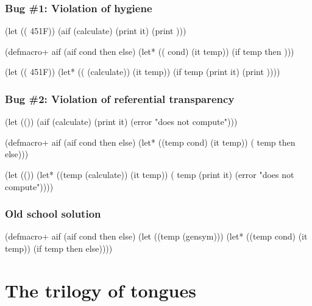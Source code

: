\documentclass[hyperref={bookmarks=false}]{beamer}
\begin{document}
\begin{frame}[fragile]
\frametitle{Bug \#1: Violation of hygiene}
\begin{semiverbatim}
(let ((\text{\color{blue}{temp}} 451{\textdegree}F))
  (aif (calculate)
    (print it)
    (print \text{\color{blue}{temp}})))

(defmacro+ aif
  (aif cond then else)
  (let* ((\text{\color{red}{temp}} cond)
         (it temp))
    (if temp then \text{\color{red}{else}})))

(let ((\text{\color{blue}{temp}} 451{\textdegree}F))
  (let* ((\text{\color{red}{temp}} (calculate))
         (it temp))
    (if temp
      (print it)
      (print \text{\color{red}{temp}}))))
\end{semiverbatim}
\end{frame}

\begin{frame}[fragile]
\frametitle{Bug \#2: Violation of referential transparency}
\begin{semiverbatim}
(let ((\text{\color{blue}{if hijacked}}))
  (aif (calculate)
    (print it)
    (error "does not compute")))

(defmacro+ aif
  (aif cond then else)
  (let* ((temp cond)
         (it temp))
    (\text{\color{red}{if}} temp then else))) \text{\color{red}{;; core if}}

(let ((\text{\color{blue}{if hijacked}}))
  (let* ((temp (calculate))
         (it temp))
    (\text{\color{blue}{if}} temp \text{\color{blue}{;; hijacked if}}
      (print it)
      (error "does not compute"))))
\end{semiverbatim}
\end{frame}

\begin{frame}[fragile]
\frametitle{Old school solution}
\begin{semiverbatim}
(defmacro+ aif
  (aif cond then else)
  \alert{(let ((temp (gensym)))}
    (let* ((temp cond)
           (it temp))
      (if temp then else))))
\end{semiverbatim}

\text{\color{blue}{And please don't rename core forms}}
\end{frame}

\section{The trilogy of tongues}
\end{document}
